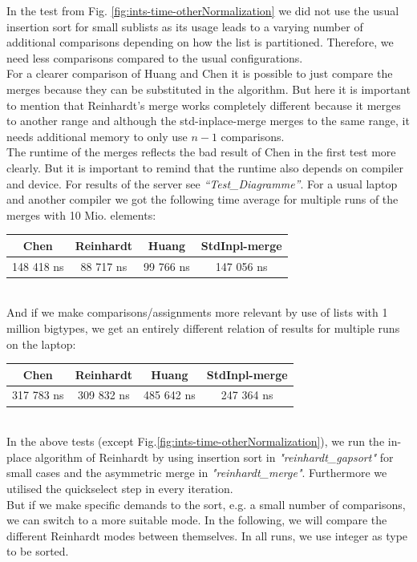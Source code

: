 \documentclass[11pt,pdftex,a4paper, twocolumn]{article}
\begin{document}
In the test from Fig. \ref{fig:ints-time-otherNormalization} we did not use the usual insertion sort for small sublists as its usage leads to a varying number of additional comparisons depending on how the list is partitioned. Therefore, we need less comparisons compared to the usual configurations. \\
For a clearer comparison of Huang and Chen it is possible to just compare the merges because they can be substituted in the algorithm. But here it is important to mention that Reinhardt’s merge works completely different because it merges to another range and although the std-inplace-merge merges to the same range, it needs additional memory to only use $ n-1 $ comparisons. \\
The runtime of the merges reflects the bad result of Chen in the first test more clearly. But it is important to remind that the runtime also depends on compiler and device. For results of the server see \textit{“Test\_Diagramme”}. For a usual laptop and another compiler we got the following time average for multiple runs of the merges with 10 Mio. elements: \\
\scriptsize
\begin{tabular}{|c|c|c|c|} \hline
Chen & Reinhardt & Huang & StdInpl-merge \\ \hline
148 418 ns & 88 717 ns & 99 766 ns & 147 056 ns \\ \hline
\end{tabular}
\normalsize \\
And if we make comparisons/assignments more relevant by use of lists with 1 million bigtypes, we get an entirely different relation of results for multiple runs on the laptop: \\
\scriptsize
\begin{tabular}{|c|c|c|c|} \hline
Chen & Reinhardt & Huang & StdInpl-merge \\ \hline
317 783 ns & 309 832 ns & 485 642 ns & 247 364 ns \\ \hline
\end{tabular}
\normalsize \\
In the above tests (except Fig.\ref{fig:ints-time-otherNormalization}), we run the in-place algorithm of Reinhardt by using insertion sort in \textit{"reinhardt\_gapsort"} for small cases and the asymmetric merge in \textit{"reinhardt\_merge"}. Furthermore we utilised the quickselect step in every iteration. \\ %
But if we make specific demands to the sort, e.g. a small number of comparisons, we can switch to a more suitable mode. In the following, we will compare the different Reinhardt modes between themselves. In all runs, we use integer as type to be sorted. \\
\end{document}
